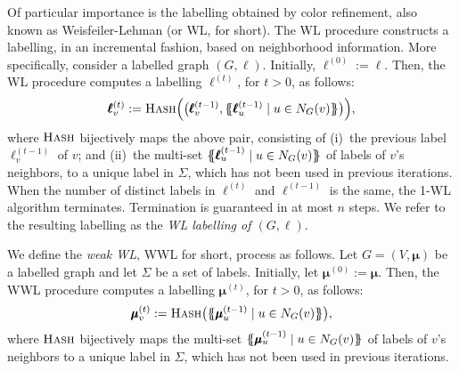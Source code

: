Of particular importance is the labelling obtained by color refinement, also known as Weisfeiler-Lehman (or WL, for short). The WL procedure constructs a labelling, in an incremental fashion, based on neighborhood information. More specifically, consider a labelled graph $(G,\pmb{\ell})$. Initially, 
$\pmb{\ell}^{(0)}:=\pmb{\ell}$. Then, the WL procedure computes a labelling $\pmb{\ell}^{(t)}$, for $t> 0$, as follows: 
$$
\pmb{\ell}^{(t)}_v:=\textsc{Hash}\Bigl(\bigl(\pmb{\ell}^{(t-1)}_v,\{\!\!\{ \pmb{\ell}_u^{(t-1)} \mathrel{\mid} u \in N_G(v) \}\!\!\}\bigr)\Bigr),
$$
where $\textsc{Hash}$ bijectively maps the above pair, consisting of (i)~the previous label 
$\pmb{\ell}^{(t-1)}_v$ of $v$; and (ii)~the multi-set $\{\!\!\{ \pmb{\ell}_u^{(t-1)} \mathrel{\mid} u \in N_G(v) \}\!\!\}$ of labels of $v$'s neighbors, to a unique label in $\Sigma$, which has not been used in previous iterations. When the number of distinct labels in $\pmb{\ell}^{(t)}$ and $\pmb{\ell}^{(t-1)}$ is the same, the 1-WL algorithm terminates.
Termination is guaranteed in at most $n$ steps. We refer to the resulting labelling as the \textit{WL labelling of $(G,\pmb{\ell})$}. 


We define the \textit{weak WL}, WWL for short, process as follows. Let $G=(V,\pmb{\mu})$ be a labelled graph and let $\Sigma$ be a set of labels. Initially, let $\pmb{\mu}^{(0)}:=\pmb{\mu}$. 
Then, the WWL procedure computes a labelling $\pmb{\mu}^{(t)}$, for $t> 0$, as follows: 
$$
\pmb{\mu}^{(t)}_v:=\textsc{Hash}\bigl(\{\!\!\{ \pmb{\mu}_u^{(t-1)} \mathrel{\mid} u \in N_G(v) \}\!\!\}\bigr),
$$
where $\textsc{Hash}$ bijectively maps the multi-set $\{\!\!\{ \pmb{\mu}_u^{(t-1)} \mathrel{\mid} u \in N_G(v) \}\!\!\}$ of labels of $v$'s neighbors to a unique label in $\Sigma$, which has not been used in previous iterations. 

